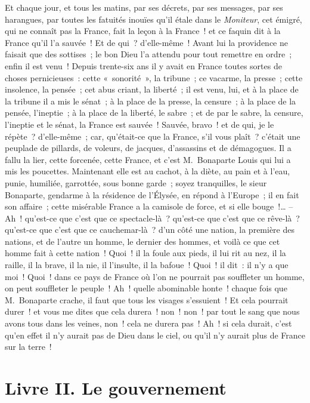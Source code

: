 \documentclass[french,twoside]{book} %
\newcommand\chapteropen{} %
\newcommand\chapterclose{} %
\begin{document}
Et chaque jour, et tous les matins, par ses décrets, par ses messages, par ses harangues, par toutes les fatuités inouïes qu’il étale dans le \emph{Moniteur}, cet émigré, qui ne connaît pas la France, fait la leçon à la France ! et ce faquin dit à la France qu’il l’a sauvée ! Et de qui ? d’elle-même ! Avant lui la providence ne faisait que des sottises ; le bon Dieu l’a attendu pour tout remettre en ordre ; enfin il est venu ! Depuis trente-six ans il y avait en France toutes sortes de choses pernicieuses : cette « sonorité », la tribune ; ce vacarme, la presse ; cette insolence, la pensée ; cet abus criant, la liberté ; il est venu, lui, et à la place de la tribune il a mis le sénat ; à la place de la presse, la censure ; à la place de la pensée, l’ineptie ; à la place de la liberté, le sabre ; et de par le sabre, la censure, l’ineptie et le sénat, la France est sauvée ! Sauvée, bravo ! et de qui, je le répète ? d’elle-même ; car, qu’était-ce que la France, s’il vous plaît ? c’était une peuplade de pillards, de voleurs, de jacques, d’assassins et de démagogues. Il a fallu la lier, cette forcenée, cette France, et c’est M. Bonaparte Louis qui lui a mis les poucettes. Maintenant elle est au cachot, à la diète, au pain et à l’eau, punie, humiliée, garrottée, sous bonne garde ; soyez tranquilles, le sieur Bonaparte, gendarme à la résidence de l’Élysée, en répond à l’Europe ; il en fait son affaire ; cette misérable France a la camisole de force, et si elle bouge !… – Ah ! qu’est-ce que c’est que ce spectacle-là ? qu’est-ce que c’est que ce rêve-là ? qu’est-ce que c’est que ce cauchemar-là ? d’un côté une nation, la première des nations, et de l’autre un homme, le dernier des hommes, et voilà ce que cet homme fait à cette nation ! Quoi ! il la foule aux pieds, il lui rit au nez, il la raille, il la brave, il la nie, il l’insulte, il la bafoue ! Quoi ! il dit : il n’y a que moi ! Quoi ! dans ce pays de France où l’on ne pourrait pas souffleter un homme, on peut souffleter le peuple ! Ah ! quelle abominable honte ! chaque fois que M. Bonaparte crache, il faut que tous les visages s’essuient ! Et cela pourrait durer ! et vous me dites que cela durera ! non ! non ! par tout le sang que nous avons tous dans les veines, non ! cela ne durera pas ! Ah ! si cela durait, c’est qu’en effet il n’y aurait pas de Dieu dans le ciel, ou qu’il n’y aurait plus de France sur la terre !
\chapterclose


\chapteropen

\chapter[{Livre II. Le gouvernement}]{Livre II. Le gouvernement}
\renewcommand{\leftmark}{Livre II. Le gouvernement}
\end{document}
